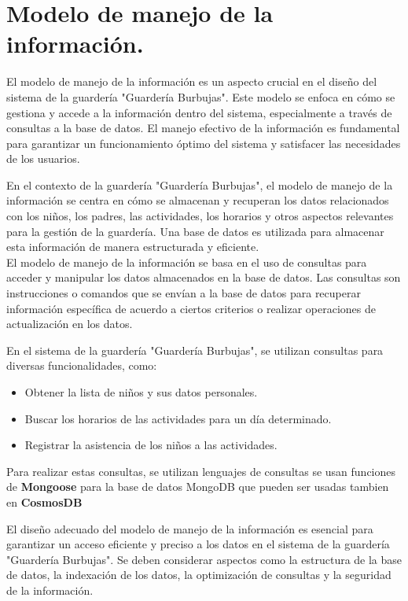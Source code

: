\chapter{Modelo de manejo de la información.}	

El modelo de manejo de la información es un aspecto crucial en el diseño del sistema de la guardería "Guardería Burbujas". Este modelo se enfoca en cómo se gestiona y accede a la información dentro del sistema, especialmente a través de consultas a la base de datos. El manejo efectivo de la información es fundamental para garantizar un funcionamiento óptimo del sistema y satisfacer las necesidades de los usuarios.

En el contexto de la guardería "Guardería Burbujas", el modelo de manejo de la información se centra en cómo se almacenan y recuperan los datos relacionados con los niños, los padres, las actividades, los horarios y otros aspectos relevantes para la gestión de la guardería. Una base de datos es utilizada para almacenar esta información de manera estructurada y eficiente.
\\

El modelo de manejo de la información se basa en el uso de consultas para acceder y manipular los datos almacenados en la base de datos. Las consultas son instrucciones o comandos que se envían a la base de datos para recuperar información específica de acuerdo a ciertos criterios o realizar operaciones de actualización en los datos.

En el sistema de la guardería "Guardería Burbujas", se utilizan consultas para diversas funcionalidades, como:

\begin{itemize}
\item Obtener la lista de niños y sus datos personales.
\item Buscar los horarios de las actividades para un día determinado.
\item Registrar la asistencia de los niños a las actividades.
\end{itemize}

Para realizar estas consultas, se utilizan lenguajes de consultas se usan funciones de \textbf{Mongoose} para la base de datos MongoDB que pueden ser usadas tambien en \textbf{CosmosDB}

El diseño adecuado del modelo de manejo de la información es esencial para garantizar un acceso eficiente y preciso a los datos en el sistema de la guardería "Guardería Burbujas". Se deben considerar aspectos como la estructura de la base de datos, la indexación de los datos, la optimización de consultas y la seguridad de la información.
\\

